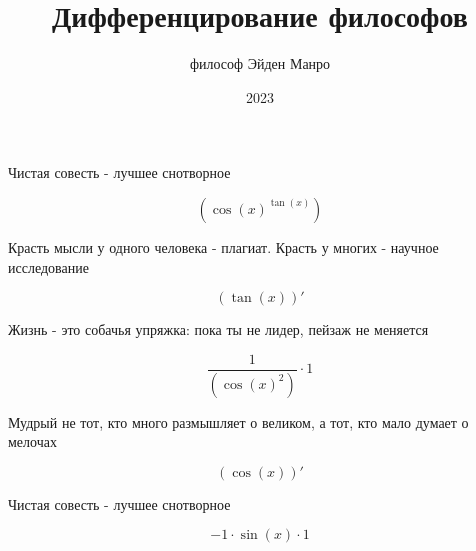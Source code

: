\documentclass[a4paper,12pt]{article}
\title{\textbf{Дифференцирование философов}}
\author{философ Эйден Манро}
\date{2023}
\begin{document}
\maketitle
\begin{center}
Чистая совесть - лучшее снотворное
\end{center}


\begin{center}
\begin{equation}
(\cos(x)^{\tan(x)})
\end{equation}
\end{center}

\begin{center}
Красть мысли у одного человека - плагиат. Красть у многих - научное исследование
\end{center}


\begin{center}
\begin{equation}
(\tan(x))'
\end{equation}
\end{center}

\begin{center}
Жизнь - это собачья упряжка: пока ты не лидер, пейзаж не меняется
\end{center}


\begin{center}
\begin{equation}
 \frac{1 }{ (\cos(x)^{2}) }  \cdot 1
\end{equation}
\end{center}

\begin{center}
Мудрый не тот, кто много размышляет о великом, а тот, кто мало думает о мелочах
\end{center}


\begin{center}
\begin{equation}
(\cos(x))'
\end{equation}
\end{center}

\begin{center}
Чистая совесть - лучшее снотворное
\end{center}


\begin{center}
\begin{equation}
-1 \cdot \sin(x) \cdot 1
\end{equation}
\end{center}
\end{document}
